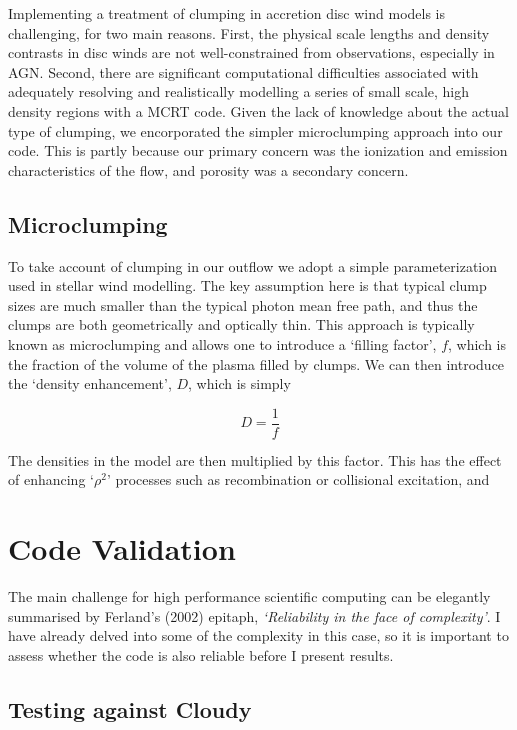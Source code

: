 Implementing a treatment of clumping in accretion disc wind models is challenging, for
two main reasons. First, the physical scale lengths and density contrasts 
in disc winds are not well-constrained from observations, especially in AGN.  
Second, there are significant computational difficulties associated with adequately
resolving and realistically modelling a series of small scale, high density
regions with a MCRT code. Given the lack of knowledge about the actual 
type of clumping, we encorporated the simpler microclumping approach into our code.
This is partly because our primary concern was the ionization and 
emission characteristics of the flow, and porosity was a secondary concern.


\subsection{Microclumping}

To take account of clumping in our outflow we adopt a simple parameterization
used in stellar wind modelling. The key assumption here is that typical clump sizes
are much smaller than the typical photon mean free path, and thus the clumps are 
both geometrically and optically thin. This approach is typically 
known as microclumping and allows one to introduce a `filling factor', $f$, which is the 
fraction of the volume of the plasma filled by clumps. We can then introduce the 
`density enhancement', $D$, which is simply 

\begin{equation}
D = \frac{1}{f}
\end{equation}

The densities in the model are then multiplied by this factor. This has the effect 
of enhancing `$\rho^2$' processes such as recombination or collisional excitation,
and 


\section{Code Validation}
\label{sec:code_validation}

The main challenge for high performance scientific computing can be 
elegantly summarised by Ferland's (2002) epitaph, {\sl `Reliability in the face 
of complexity'}. I have already delved into some of the complexity in this case,
so it is important to assess whether the code is also reliable before I present
results. 

\subsection{Testing against Cloudy}



